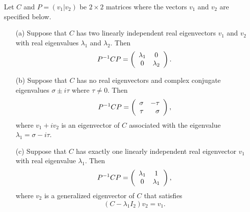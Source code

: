 \documentclass{ximera}
\begin{document}
\begin{theorem}  \label{T:putinform}
Let $C$ and $P=(v_1|v_2)$ be $2\times 2$ matrices where the vectors
$v_1$ and $v_2$ are specified below.
\begin{itemize}
\item[(a)]	Suppose that $C$ has two linearly independent
real eigenvectors $v_1$ and $v_2$ with real eigenvalues $\lambda_1$
and $\lambda_2$.  Then
\[
P^{-1} CP = \left(\begin{array}{cc} \lambda_1 & 0\\ 0 &\lambda_2\end{array}\right).
\]

\item[(b)]	Suppose that $C$ has no real eigenvectors and
complex conjugate eigenvalues $\sigma\pm i\tau$ where
$\tau\neq 0$.  Then
\[
P^{-1} CP = \left(\begin{array}{rr} \sigma & -\tau\\ \tau &\sigma\end{array}\right),
\]
where $v_1 + iv_2$ is an eigenvector of $C$ associated with the
eigenvalue $\lambda_1=\sigma-i\tau$.

\item[(c)]	Suppose that $C$ has exactly one linearly
independent real eigenvector $v_1$ with real eigenvalue $\lambda_1$.
Then
\[
P^{-1} CP = \left(\begin{array}{cc} \lambda_1 & 1\\ 0 &\lambda_1\end{array}\right),
\]
where  $v_2$ is a generalized eigenvector of $C$ that satisfies
\begin{equation}  \label{e:Cw=lw+v}
(C-\lambda_1 I_2) v_2 =  v_1.
\end{equation}

\end{itemize}
\end{theorem}
\end{document}
